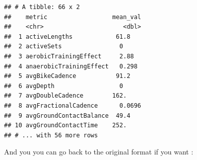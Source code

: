 \documentclass[
]{book}
\newenvironment{Shaded}{\begin{snugshade}}{\end{snugshade}}
\newcommand{\DataTypeTok}[1]{\textcolor[rgb]{0.13,0.29,0.53}{#1}}
\newcommand{\KeywordTok}[1]{\textcolor[rgb]{0.13,0.29,0.53}{\textbf{#1}}}
\newcommand{\NormalTok}[1]{#1}
\newcommand{\OperatorTok}[1]{\textcolor[rgb]{0.81,0.36,0.00}{\textbf{#1}}}
\newcommand{\StringTok}[1]{\textcolor[rgb]{0.31,0.60,0.02}{#1}}
\begin{document}
\begin{Shaded}
\end{Shaded}

\begin{verbatim}
## # A tibble: 66 x 2
##    metric                  mean_val
##    <chr>                      <dbl>
##  1 activeLengths            61.8   
##  2 activeSets                0     
##  3 aerobicTrainingEffect     2.88  
##  4 anaerobicTrainingEffect   0.298 
##  5 avgBikeCadence           91.2   
##  6 avgDepth                  0     
##  7 avgDoubleCadence        162.    
##  8 avgFractionalCadence      0.0696
##  9 avgGroundContactBalance  49.4   
## 10 avgGroundContactTime    252.    
## # ... with 56 more rows
\end{verbatim}

And you you can go back to the original format if you want :

\begin{Shaded}
\end{Shaded}
\end{document}
